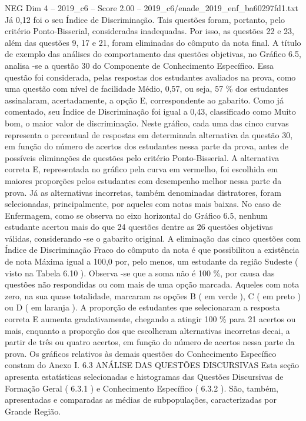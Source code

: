 \begin{textsample}{NEG Dim 4 – 2019\_c6 – Score 2.00 – 2019\_c6/enade\_2019\_enf\_ba60297fd1.txt}
Já 0,12 foi o seu Índice de Discriminação.
Tais questões foram, portanto, pelo critério Ponto-Bisserial, consideradas inadequadas.
Por isso, as questões 22 e 23, além das questões 9, 17 e 21, foram eliminadas do cômputo da nota final.
A título de exemplo das análises do comportamento das questões objetivas, no Gráfico 6.5, analisa -se a questão 30 do Componente de Conhecimento Específico.
Essa questão foi considerada, pelas respostas dos estudantes avaliados na prova, como uma questão com nível de facilidade Médio, 0,57, ou seja, 57 \% dos estudantes assinalaram, acertadamente, a opção E, correspondente ao gabarito.
Como já comentado, seu Índice de Discriminação foi igual a 0,43, classificado como Muito bom, o maior valor de discriminação.
Neste gráfico, cada uma das cinco curvas representa o percentual de respostas em determinada alternativa da questão 30, em função do número de acertos dos estudantes nessa parte da prova, antes de possíveis eliminações de questões pelo critério Ponto-Bisserial.
A alternativa correta E, representada no gráfico pela curva em vermelho, foi escolhida em maiores proporções pelos estudantes com desempenho melhor nessa parte da prova.
Já as alternativas incorretas, também denominadas distratores, foram selecionadas, principalmente, por aqueles com notas mais baixas.
No caso de Enfermagem, como se observa no eixo horizontal do Gráfico 6.5, nenhum estudante acertou mais do que 24 questões dentre as 26 questões objetivas válidas, considerando -se o gabarito original.
A eliminação das cinco questões com Índice de Discriminação Fraco do cômputo da nota é que possibilitou a existência de nota Máxima igual a 100,0 por, pelo menos, um estudante da região Sudeste ( visto na Tabela 6.10 ).
Observa -se que a soma não é 100 \%, por causa das questões não respondidas ou com mais de uma opção marcada.
Aqueles com nota zero, na sua quase totalidade, marcaram as opções B ( em verde ), C ( em preto ) ou D ( em laranja ).
A proporção de estudantes que selecionaram a resposta correta E aumenta gradativamente, chegando a atingir 100 \% para 21 acertos ou mais, enquanto a proporção dos que escolheram alternativas incorretas decai, a partir de três ou quatro acertos, em função do número de acertos nessa parte da prova.
Os gráficos relativos às demais questões do Conhecimento Específico constam do Anexo I. 6.3 ANÁLISE DAS QUESTÕES DISCURSIVAS Esta seção apresenta estatísticas selecionadas e histogramas das Questões Discursivas de Formação Geral ( 6.3.1 ) e Conhecimento Específico ( 6.3.2 ).
São, também, apresentadas e comparadas as médias de subpopulações, caracterizadas por Grande Região.

\end{textsample}
